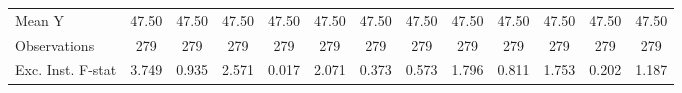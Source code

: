 {\begin{tabular}{l*{12}{c}}
\midrule
Mean Y      &       47.50         &       47.50         &       47.50         &       47.50         &       47.50         &       47.50         &       47.50         &       47.50         &       47.50         &       47.50         &       47.50         &       47.50         \\
Observations&         279         &         279         &         279         &         279         &         279         &         279         &         279         &         279         &         279         &         279         &         279         &         279         \\
Exc. Inst. F-stat&       3.749         &       0.935         &       2.571         &       0.017         &       2.071         &       0.373         &       0.573         &       1.796         &       0.811         &       1.753         &       0.202         &       1.187         \\
\bottomrule
\end{tabular}
}
